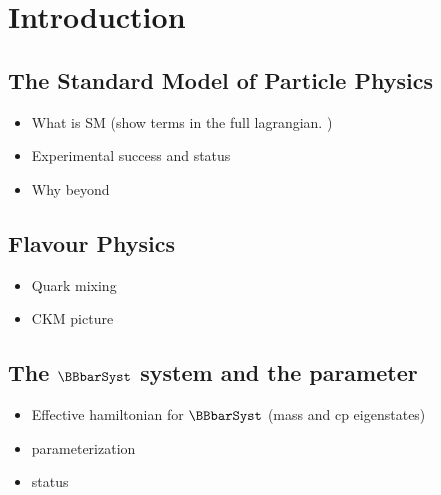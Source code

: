 
\chapter{Introduction}
\label{Introduction}

\section{The Standard Model of Particle Physics}
\begin{itemize}
  \item What is SM (show terms in the full lagrangian. )
  \item Experimental success and status
  \item Why beyond
\end{itemize}

\section{Flavour Physics}
\begin{itemize}
  \item Quark mixing
  \item CKM picture
\end{itemize}

\section{The $\BBbarSyst$ system and the \phis parameter}
\label{Phenomenology}

\begin{itemize}
  \item Effective hamiltonian for $\BBbarSyst$ (mass and cp eigenstates)
  \item \phis parameterization
  \item \phis status
\end{itemize}


